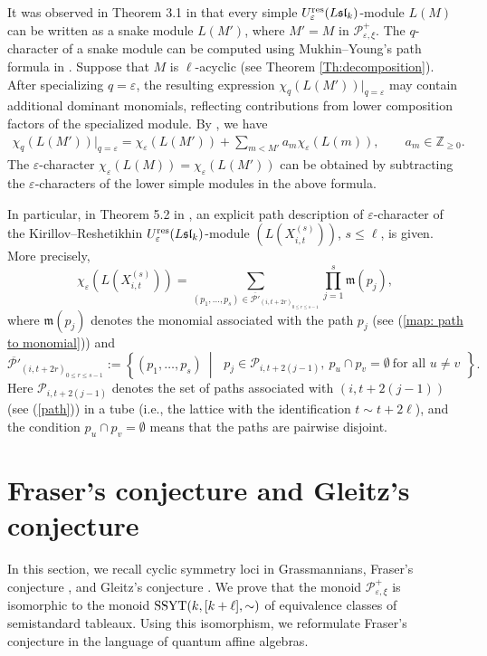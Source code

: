 \documentclass[11pt, reqno]{amsart}
\theoremstyle{plain}
\theoremstyle{definition}
\numberwithin{equation}{section}
\newcommand{\res}{{\rm res}}
\begin{document}
It was observed in Theorem 3.1 in \cite{ALLZ25} that every simple $U_{\varepsilon}^{\res}({L\mathfrak{sl}_k})$-module $L(M)$ can be written as a snake module $L(M')$, where $M'=M$ in $\mathcal{P}_{\varepsilon, \xi}^+$. The $q$-character of a snake module can be computed using Mukhin--Young's path formula in \cite{MY12}. Suppose that $M$ is $\ell$-acyclic (see Theorem \ref{Th:decomposition}). After specializing $q=\varepsilon$, the resulting expression $\chi_q(L(M'))|_{q=\varepsilon}$ may contain additional dominant monomials, reflecting contributions from lower composition factors of the specialized module. By \cite[Proposition 2.5]{FM02}, we have 
\begin{align*}
\chi_q(L(M'))\big|_{q=\varepsilon}
= \chi_{\varepsilon}(L(M'))+\sum_{m < M'} a_m \chi_{\varepsilon}(L(m)),
\qquad a_m \in \mathbb{Z}_{\ge 0}.
\end{align*}
The $\varepsilon$-character $\chi_{\varepsilon}(L(M))=\chi_{\varepsilon}(L(M'))$ can be obtained by subtracting the $\varepsilon$-characters of the lower simple modules in the above formula.
 
In particular, in Theorem 5.2 in \cite{ALLZ25}, an explicit path description of $\varepsilon$-character of the Kirillov--Reshetikhin $U_{\varepsilon}^{\res}({L\mathfrak{sl}_k})$-module $(L(X_{i,t}^{(s)}))$, $s\leq \ell$, is given. More precisely, 
\[
\chi_\varepsilon(L(X_{i,t}^{(s)}))=\sum_{(p_{1},\ldots,p_{s}) \in \overline{\mathscr{P'}}_{(i,t+2r)_{0 \leq r \leq s-1}}} \prod_{j=1}^{s}\mathfrak{m}(p_{j}),
\]
where $\mathfrak{m}(p_j)$ denotes the monomial associated with the path $p_j$ (see (\ref{map: path to monomial})) and 
\[
\overline{\mathscr{P'}}_{(i,t+2r)_{0\le r\le s-1}}
:=\left\{(p_1,\ldots,p_s)\ \middle|\
\begin{array}{l}
p_j \in \mathscr{P}_{i,t+2(j-1)},\ 
p_u \cap p_v = \emptyset\ \text{for all } u\ne v
\end{array}
\right\}.
\]
Here $\mathscr{P}_{i,t+2(j-1)}$ denotes the set of paths associated with $(i,t+2(j-1))$ (see (\ref{path})) in a tube (i.e., the lattice with the identification $t \sim t+2\ell$), and the condition $p_u \cap p_v = \emptyset$ means that the paths are pairwise disjoint.


\section{Fraser's conjecture and Gleitz's conjecture}\label{Section: Fraser's conjecture and Gleitz's conjecture}
In this section, we recall cyclic symmetry loci in Grassmannians, Fraser's conjecture \cite{Fra20}, and Gleitz's conjecture \cite{Gle16}. We prove that the monoid $\mathcal{P}^+_{\varepsilon, \xi}$ is isomorphic to the monoid ${\rm SSYT}(k, [k+\ell], \sim)$ of equivalence classes of semistandard tableaux. Using this isomorphism, we reformulate Fraser's conjecture in the language of quantum affine algebras.
\end{document}
